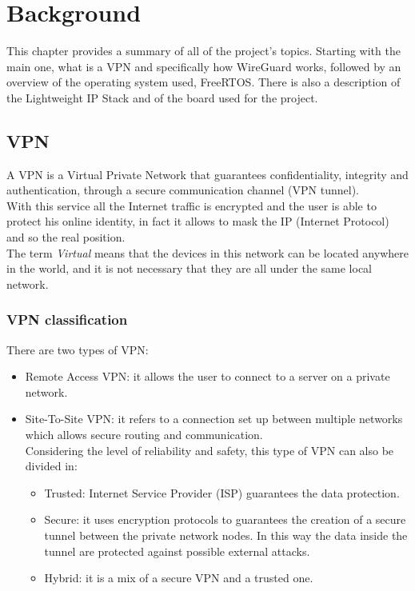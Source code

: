 \chapter{Background}
This chapter provides a summary of all of the project's topics. Starting with the main one, what is a VPN and specifically how WireGuard works, followed by an overview of the operating system used, FreeRTOS. There is also a description of the Lightweight IP Stack and of the board used for the project.
\section{VPN}
A VPN is a Virtual Private Network that guarantees confidentiality, integrity and authentication, through a secure communication channel (VPN tunnel).\\
With this service all the Internet traffic is encrypted and the user is able to protect his online identity, in fact it allows to mask the IP (Internet Protocol) and so the real position.\\
The term \emph{Virtual} means that the devices in this network can be located anywhere in the world, and it is not necessary that they are all under the same local network.

\subsection{VPN classification}
There are two types of VPN:
\begin{itemize}
    \item Remote Access VPN: it allows the user to connect to a server on a private network. 
    \item Site-To-Site VPN: it refers to a connection set up between multiple networks which allows secure routing and communication.\\
        Considering the level of reliability and safety, this type of VPN can also be divided in:
        \begin{itemize}
            \item Trusted: Internet Service Provider (ISP) guarantees the data protection.
            \item Secure: it uses encryption protocols to guarantees the creation of a secure tunnel between the private network nodes. In this way the data inside the tunnel are protected against possible external attacks.
            \item Hybrid: it is a mix of a secure VPN and a trusted one.
        \end{itemize}
\end{itemize}

